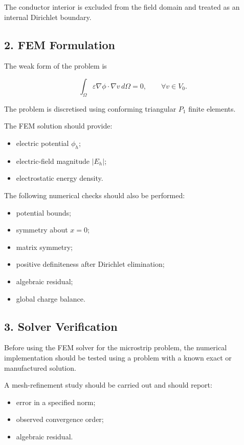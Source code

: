 The conductor interior is excluded from the field domain and treated as an internal Dirichlet boundary.

\subsection*{2. FEM Formulation}

The weak form of the problem is

\[
\int_{\Omega}
\varepsilon \nabla \phi \cdot \nabla v
\, d\Omega
=
0,
\qquad
\forall v \in V_0.
\]

The problem is discretised using conforming triangular \(P_1\) finite elements.

The FEM solution should provide:

\begin{itemize}
    \item electric potential \(\phi_h\);
    \item electric-field magnitude \(\lvert E_h \rvert\);
    \item electrostatic energy density.
\end{itemize}

The following numerical checks should also be performed:

\begin{itemize}
    \item potential bounds;
    \item symmetry about \(x=0\);
    \item matrix symmetry;
    \item positive definiteness after Dirichlet elimination;
    \item algebraic residual;
    \item global charge balance.
\end{itemize}

\subsection*{3. Solver Verification}

Before using the FEM solver for the microstrip problem, the numerical implementation should be tested using a problem with a known exact or manufactured solution.

A mesh-refinement study should be carried out and should report:

\begin{itemize}
    \item error in a specified norm;
    \item observed convergence order;
    \item algebraic residual.
\end{itemize}

